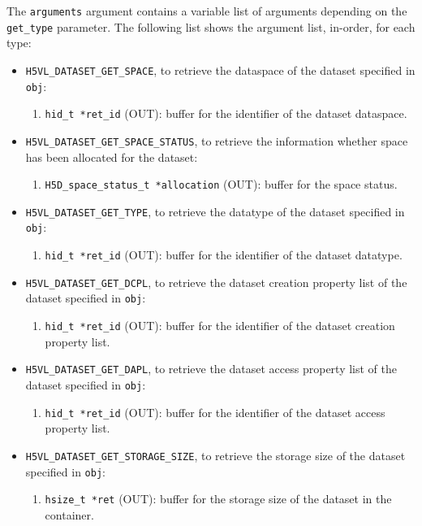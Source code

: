 The {\tt arguments} argument contains a variable list of arguments
depending on the {\tt get\_type} parameter. The following list shows
the argument list, in-order, for each type:

\begin{itemize}
\item {\tt H5VL\_DATASET\_GET\_SPACE}, to retrieve the dataspace of the
  dataset specified in {\tt obj}:
  \begin{enumerate}
  \item {\tt hid\_t *ret\_id} (OUT): buffer for the identifier of the
    dataset dataspace.
  \end{enumerate}

\item {\tt H5VL\_DATASET\_GET\_SPACE\_STATUS}, to retrieve the
  information whether space has been allocated for the dataset:
  \begin{enumerate}
  \item {\tt H5D\_space\_status\_t *allocation} (OUT): buffer for the
    space status.
  \end{enumerate}

\item {\tt H5VL\_DATASET\_GET\_TYPE}, to retrieve the datatype of the
  dataset specified in {\tt obj}:
  \begin{enumerate}
  \item {\tt hid\_t *ret\_id} (OUT): buffer for the identifier of the
    dataset datatype.
  \end{enumerate}

\item {\tt H5VL\_DATASET\_GET\_DCPL}, to retrieve the dataset creation
  property list of the dataset specified in {\tt obj}:
  \begin{enumerate}
  \item {\tt hid\_t *ret\_id} (OUT): buffer for the identifier of the
    dataset creation property list.
  \end{enumerate}

\item {\tt H5VL\_DATASET\_GET\_DAPL}, to retrieve the dataset access
  property list of the dataset specified in {\tt obj}:
  \begin{enumerate}
  \item {\tt hid\_t *ret\_id} (OUT): buffer for the identifier of the
    dataset access property list.
  \end{enumerate}

\item {\tt H5VL\_DATASET\_GET\_STORAGE\_SIZE}, to retrieve the storage
  size of the dataset specified in {\tt obj}:
  \begin{enumerate}
  \item {\tt hsize\_t *ret} (OUT): buffer for the storage size of
    the dataset in the container.
  \end{enumerate}


\end{itemize}
